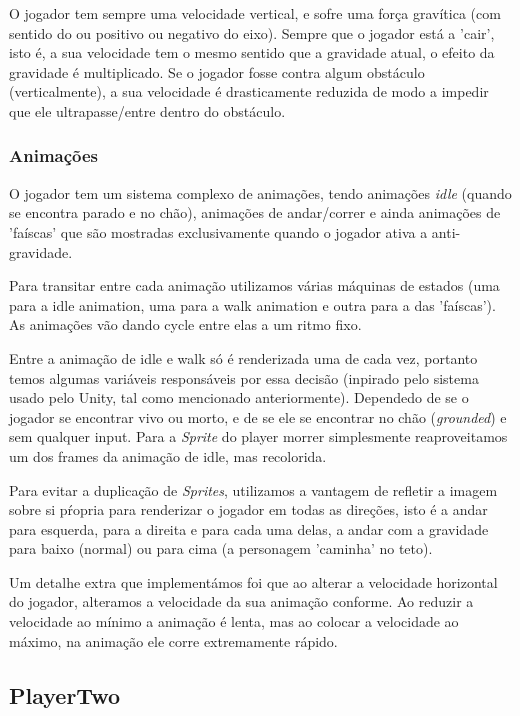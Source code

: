 \documentclass{report}
\begin{document}
O jogador tem sempre uma velocidade vertical, e sofre uma força gravítica (com sentido do ou positivo ou negativo do eixo). Sempre que o jogador está a 'cair', isto é, a sua velocidade tem o mesmo sentido que a gravidade atual, o efeito da gravidade é multiplicado. Se o jogador fosse contra algum obstáculo (verticalmente), a sua velocidade é drasticamente reduzida de modo a impedir que ele ultrapasse/entre dentro do obstáculo.

\subsubsection{Animações}

O jogador tem um sistema complexo de animações, tendo animações \textit{idle} (quando se encontra parado e no chão), animações de andar/correr e ainda animações de 'faíscas' que são mostradas exclusivamente quando o jogador ativa a anti-gravidade.

Para transitar entre cada animação utilizamos várias máquinas de estados (uma para a idle animation, uma para a walk animation e outra para a das 'faíscas'). As animações vão dando cycle entre elas a um ritmo fixo.

Entre a animação de idle e walk só é renderizada uma de cada vez, portanto temos algumas variáveis responsáveis por essa decisão (inpirado pelo sistema usado pelo Unity, tal como mencionado anteriormente). Dependedo de se o jogador se encontrar vivo ou morto, e de se ele se encontrar no chão (\textit{grounded}) e sem qualquer input. Para a \textit{Sprite} do player morrer simplesmente reaproveitamos um dos frames da animação de idle, mas recolorida.

Para evitar a duplicação de \textit{Sprites}, utilizamos a vantagem de refletir a imagem sobre si pŕopria para renderizar o jogador em todas as direções, isto é a andar para esquerda, para a direita e para cada uma delas, a andar com a gravidade para baixo (normal) ou para cima (a personagem 'caminha' no teto).

Um detalhe extra que implementámos foi que ao alterar a velocidade horizontal do jogador, alteramos a velocidade da sua animação conforme. Ao reduzir a velocidade ao mínimo a animação é lenta, mas ao colocar a velocidade ao máximo, na animação ele corre extremamente rápido.

\subsection{PlayerTwo}
\end{document}
